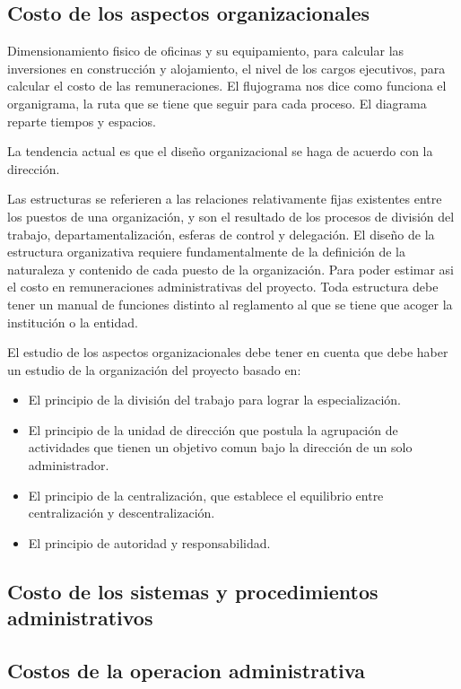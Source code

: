 \documentclass[a4paper, 11pt, oneside]{article}
\begin{document}
\subsection{Costo de los aspectos organizacionales}

Dimensionamiento fisico de oficinas y su equipamiento, para calcular las inversiones en construcción y alojamiento, el nivel de los
cargos ejecutivos, para calcular el costo de las remuneraciones. El flujograma nos dice como funciona el organigrama, la ruta que se
tiene que seguir para cada proceso. El diagrama reparte tiempos y espacios.

La tendencia actual es que el diseño organizacional se haga de acuerdo con la dirección.

Las estructuras se referieren a las relaciones relativamente fijas existentes entre los puestos de una organización, y son el resultado
de los procesos de división del trabajo, departamentalización, esferas de control y delegación. El diseño de la estructura organizativa
requiere fundamentalmente de la definición de la naturaleza y contenido de cada puesto de la organización. Para poder estimar asi el
costo en remuneraciones administrativas del proyecto. Toda estructura debe tener un manual de funciones distinto al reglamento al que
se tiene que acoger la institución o la entidad.

El estudio de los aspectos organizacionales debe tener en cuenta que debe haber un estudio de la organización del proyecto basado en:

\begin{itemize}
	\item El principio de la división del trabajo para lograr la especialización.
	\item El principio de la unidad de dirección que postula la agrupación de actividades que tienen un objetivo comun bajo la dirección
	      de un solo administrador.
	\item El principio de la centralización, que establece el equilibrio entre centralización y descentralización.
	\item El principio de autoridad y responsabilidad.
\end{itemize}

\subsection{Costo de los sistemas y procedimientos administrativos}

\subsection{Costos de la operacion administrativa}
\end{document}
